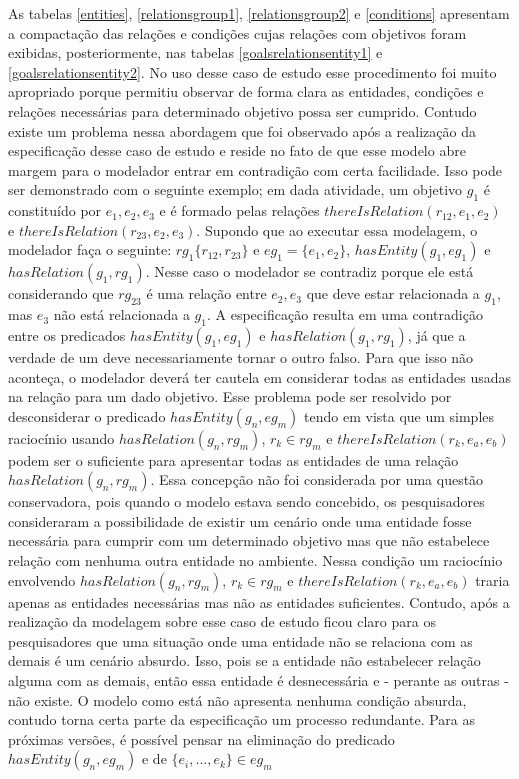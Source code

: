 As tabelas \ref{entities}, \ref{relationsgroup1}, \ref{relationsgroup2} e \ref{conditions} apresentam a compactação das relações e condições cujas relações com objetivos foram exibidas, 
posteriormente, nas tabelas \ref{goalsrelationsentity1} e \ref{goalsrelationsentity2}. No uso desse caso de estudo esse procedimento foi muito apropriado porque permitiu observar de forma 
clara as entidades, condições e relações necessárias para determinado objetivo possa ser cumprido. Contudo existe um problema nessa abordagem que foi observado após a realização da
especificação desse caso de estudo e reside no fato de que esse modelo abre margem para o modelador entrar em contradição com certa facilidade. Isso pode ser demonstrado com o  
seguinte exemplo; em dada atividade, um objetivo $g_1$ é constituído por $e_1,e_2,e_3$ e é formado pelas relações $thereIsRelation(r_{12},e_1,e_2)$ e $thereIsRelation(r_{23},e_2,e_3)$. 
Supondo que ao executar essa modelagem, o modelador faça o seguinte: $rg_1 \{ r_{12},r_{23} \}$ e $ eg_1 = \{ e_1, e_2 \} $, $ hasEntity(g_1,eg_1) $ e $ hasRelation(g_1, rg_1) $. Nesse 
caso o modelador se contradiz porque ele está considerando que $rg_{23}$ é uma relação entre $e_2, e_3$ que deve estar relacionada a $g_1$, mas $e_3$ não está relacionada a $g_1$. A especificação 
resulta em uma contradição entre os predicados $ hasEntity(g_1,eg_1) $ e $ hasRelation(g_1, rg_1) $, já que a verdade de um deve necessariamente tornar 
o outro falso. Para que isso não aconteça, o modelador deverá ter cautela em considerar todas as entidades usadas na relação para um dado objetivo. Esse problema pode ser resolvido por 
desconsiderar o predicado $hasEntity(g_n,eg_m)$ tendo em vista que um simples raciocínio usando $hasRelation(g_n,rg_m)$, $r_k \in rg_m$ e $thereIsRelation(r_k, e_a,e_b)$ podem ser o suficiente 
para apresentar todas as entidades de uma relação $ hasRelation(g_n, rg_m) $. Essa concepção não foi considerada por uma questão conservadora, pois quando o modelo estava sendo concebido, 
os pesquisadores consideraram a possibilidade de existir um cenário onde uma entidade fosse necessária para cumprir com um determinado objetivo mas que não estabelece relação com nenhuma 
outra entidade no ambiente. Nessa condição um raciocínio envolvendo $hasRelation(g_n,rg_m)$, $r_k \in rg_m$ e $thereIsRelation(r_k, e_a,e_b)$ traria apenas as entidades necessárias 
mas não as entidades suficientes. Contudo, após a realização da modelagem sobre esse caso de estudo ficou claro para os pesquisadores que uma situação onde uma entidade não se relaciona 
com as demais é um cenário absurdo. Isso, pois se a entidade não estabelecer relação alguma com as demais, então essa entidade é desnecessária e - perante as outras - não existe. O modelo 
como está não apresenta nenhuma condição absurda, contudo torna certa parte da especificação um processo redundante. Para as próximas versões, é possível pensar na eliminação do predicado 
$ hasEntity(g_n,eg_m) $ e de $ \{ e_i , ... , e_k \} \in eg_m $

